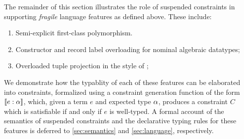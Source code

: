 \documentclass[acmsmall,screen,nonacm]{acmart}
\begin{document}

The remainder of this section illustrates the role of suspended constraints
in supporting \emph{fragile} language features as defined above.
These include:
\begin{enumerate}
  \item Semi-explicit first-class polymorphism.
  \item Constructor and record label overloading for nominal algebraic
  datatypes;
  \item Overloaded tuple projection in the style of \SML;
\end{enumerate}
We demonstrate how the typablity of each of these features can be elaborated
into constraints, formalized using a constraint generation function of the
form $\llbracket {e} : {\alpha}\rrbracket$, which, given a term $e$ and expected type $\alpha$,
produces a constraint $C$ which is satisfiable if and only if $e$ is
well-typed. A formal account of the semantics of suspended constraints and
the declarative typing rules for these features is deferred to
\cref{sec:semantics} and \cref{sec:language}, respectively.


\end{document}
